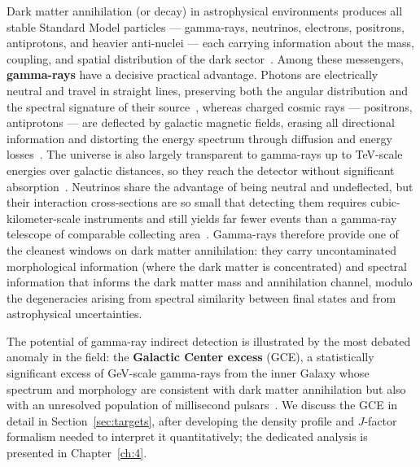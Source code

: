 Dark matter annihilation (or decay) in astrophysical environments produces all stable Standard Model particles --- gamma-rays, neutrinos, electrons, positrons, antiprotons, and heavier anti-nuclei --- each carrying information about the mass, coupling, and spatial distribution of the dark sector~\cite{Cirelli:2010xx,Arina:2023eic,Cirelli:2024ssz}.
Among these messengers, \textbf{gamma-rays} have a decisive practical advantage.
Photons are electrically neutral and travel in straight lines, preserving both the angular distribution and the spectral signature of their source~\cite{Cirelli:2024ssz,Pinetti:2021jjs}, whereas charged cosmic rays --- positrons, antiprotons --- are deflected by galactic magnetic fields, erasing all directional information and distorting the energy spectrum through diffusion and energy losses~\cite{Cirelli:2024ssz}.
The universe is also largely transparent to gamma-rays up to TeV-scale energies over galactic distances, so they reach the detector without significant absorption~\cite{Hooper:2024}.
Neutrinos share the advantage of being neutral and undeflected, but their interaction cross-sections are so small that detecting them requires cubic-kilometer-scale instruments and still yields far fewer events than a gamma-ray telescope of comparable collecting area~\cite{Cirelli:2024ssz}.
Gamma-rays therefore provide one of the cleanest windows on dark matter annihilation: they carry uncontaminated morphological information (where the dark matter is concentrated) and spectral information that informs the dark matter mass and annihilation channel, modulo the degeneracies arising from spectral similarity between final states and from astrophysical uncertainties.

The potential of gamma-ray indirect detection is illustrated by the most debated anomaly in the field: the \textbf{Galactic Center excess} (GCE), a statistically significant excess of GeV-scale gamma-rays from the inner Galaxy whose spectrum and morphology are consistent with dark matter annihilation but also with an unresolved population of millisecond pulsars~\cite{Goodenough:2009gk,Hooper:2010mq,Daylan:2014rsa,Macias:2019omb}.
We discuss the GCE in detail in Section~\ref{sec:targets}, after developing the density profile and $J$-factor formalism needed to interpret it quantitatively; the dedicated analysis is presented in Chapter~\ref{ch:4}.

